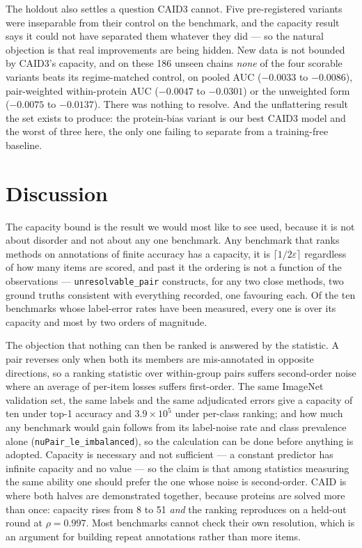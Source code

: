 \documentclass[11pt,a4paper]{article}
\newcommand{\eps}{\varepsilon}
\newcommand{\code}[1]{\texttt{\small #1}}
\begin{document}
The holdout also settles a question CAID3 cannot. Five pre-registered variants
were inseparable from their control on the benchmark, and the capacity result
says it could not have separated them whatever they did --- so the natural
objection is that real improvements are being hidden. New data is not bounded by
CAID3's capacity, and on these 186 unseen chains \emph{none} of the four
scorable variants beats its regime-matched control, on pooled AUC ($-0.0033$ to
$-0.0086$), pair-weighted within-protein AUC ($-0.0047$ to $-0.0301$) or the
unweighted form ($-0.0075$ to $-0.0137$). There was nothing to resolve. And the
unflattering result the set exists to produce: the protein-bias variant is our
best CAID3 model and the worst of three here, the only one failing to separate
from a training-free baseline.

\section*{Discussion}

The capacity bound is the result we would most like to see used, because it is
not about disorder and not about any one benchmark. Any benchmark that ranks
methods on annotations of finite accuracy has a capacity, it is
$\lceil 1/2\eps \rceil$ regardless of how many items are scored, and past it the
ordering is not a function of the observations --- \code{unresolvable\_pair}
constructs, for any two close methods, two ground truths consistent with
everything recorded, one favouring each. Of the ten benchmarks whose label-error
rates have been measured, every one is over its capacity and most by two orders
of magnitude.

The objection that nothing can then be ranked is answered by the statistic. A
pair reverses only when both its members are mis-annotated in opposite
directions, so a ranking statistic over within-group pairs suffers second-order
noise where an average of per-item losses suffers first-order. The same ImageNet
validation set, the same labels and the same adjudicated errors give a capacity
of ten under top-1 accuracy and $3.9\times10^{5}$ under per-class ranking; and
how much any benchmark would gain follows from its label-noise rate and class
prevalence alone (\code{nuPair\_le\_imbalanced}), so the calculation can be done
before anything is adopted. Capacity is necessary and not sufficient --- a
constant predictor has infinite capacity and no value --- so the claim is that
among statistics measuring the same ability one should prefer the one whose
noise is second-order. CAID is where both halves are demonstrated together,
because proteins are solved more than once: capacity rises from 8 to 51
\emph{and} the ranking reproduces on a held-out round at $\rho = 0.997$. Most
benchmarks cannot check their own resolution, which is an argument for building
repeat annotations rather than more items.
\end{document}

